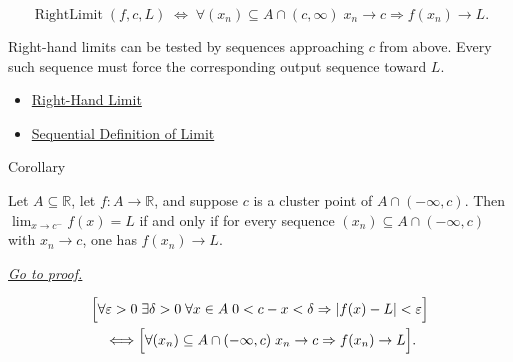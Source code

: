 \begin{remark*}
\[
  \operatorname{RightLimit}(f,c,L)
  \;\Longleftrightarrow\;
  \forall (x_n)\subseteq A\cap(c,\infty)\;
  x_n\to c\Rightarrow f(x_n)\to L.
\]
\end{remark*}

\begin{remark*}[Interpretation]
Right-hand limits can be tested by sequences approaching $c$ from above.
Every such sequence must force the corresponding output sequence toward
$L$.
\end{remark*}

\begin{dependencies}
\begin{itemize}
  \item \hyperref[def:right-hand-limit]{Right-Hand Limit}
  \item \hyperref[def:limit-function-sequential]{Sequential Definition of Limit}
\end{itemize}
\end{dependencies}


\begin{corollarybox}{Corollary}
\begin{corollary}
\label{cor:sequential-criterion-left-hand-limit}
Let $A\subseteq\mathbb{R}$, let $f:A\to\mathbb{R}$, and suppose $c$ is a
cluster point of $A\cap(-\infty,c)$. Then $\lim_{x\to c^-}f(x)=L$ if and
only if for every sequence $(x_n)\subseteq A\cap(-\infty,c)$ with
$x_n\to c$, one has $f(x_n)\to L$.

\smallskip\noindent
\hyperref[prf:sequential-criterion-left-hand-limit]{\textit{Go to proof.}}
\end{corollary}
\end{corollarybox}

\begin{remark*}
\[
\begin{aligned}
&\Bigl[\forall\varepsilon>0\;\exists\delta>0\;\forall x\in A\;
  0<c-x<\delta\Rightarrow |f(x)-L|<\varepsilon\Bigr] \\
&\quad\Longleftrightarrow
\Bigl[\forall (x_n)\subseteq A\cap(-\infty,c)\;
  x_n\to c\Rightarrow f(x_n)\to L\Bigr].
\end{aligned}
\]
\end{remark*}

